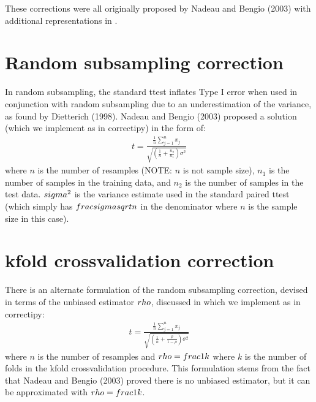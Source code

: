 \documentclass[letterpaper,10pt,english]{sphinxmanual}
\begin{document}
These corrections were all originally proposed by Nadeau and Bengio (2003) with additional representations in .


\section{Random subsampling correction}
\label{\detokenize{statistic_info:random-subsampling-correction}}
In random subsampling, the standard t\sphinxhyphen{}test inflates Type I error when used in conjunction with random subsampling due to an underestimation of the variance, as found by Dietterich (1998). Nadeau and Bengio (2003) proposed a solution (which we implement as  in correctipy) in the form of:
\begin{equation*}
\begin{split}t = \frac{\frac{1}{n} \sum_{j=1}^{n}x_{j}}{\sqrt{(\frac{1}{n} + \frac{n_{2}}{n_{1}})\sigma^{2}}}\end{split}
\end{equation*}
where \(n\) is the number of resamples (NOTE: \(n\) is not sample size), \(n_{1}\) is the number of samples in the training data, and \(n_{2}\) is the number of samples in the test data. \(\\sigma^{2}\) is the variance estimate used in the standard paired t\sphinxhyphen{}test (which simply has \(\\frac{\\sigma}{\\sqrt{n}}\) in the denominator where \(n\) is the sample size in this case).


\section{k\sphinxhyphen{}fold cross\sphinxhyphen{}validation correction}
\label{\detokenize{statistic_info:k-fold-cross-validation-correction}}
There is an alternate formulation of the random subsampling correction, devised in terms of the unbiased estimator \(\\rho\), discussed in  which we implement as  in correctipy:
\begin{equation*}
\begin{split}t = \frac{\frac{1}{n} \sum_{j=1}^{n}x_{j}}{\sqrt{(\frac{1}{n} + \frac{\rho}{1-\rho})\sigma^{2}}}\end{split}
\end{equation*}
where \(n\) is the number of resamples and \(\\rho = \\frac{1}{k}\) where \(k\) is the number of folds in the k\sphinxhyphen{}fold cross\sphinxhyphen{}validation procedure. This formulation stems from the fact that Nadeau and Bengio (2003) proved there is no unbiased estimator, but it can be approximated with \(\\rho = \\frac{1}{k}\).
\end{document}
